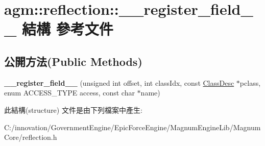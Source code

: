 \hypertarget{structagm_1_1reflection_1_1____register__field____}{}\section{agm\+:\+:reflection\+:\+:\+\_\+\+\_\+register\+\_\+field\+\_\+\+\_\+ 結構 參考文件}
\label{structagm_1_1reflection_1_1____register__field____}
\subsection*{公開方法(Public Methods)}
\begin{DoxyCompactItemize}
\item 
{\bfseries \+\_\+\+\_\+register\+\_\+field\+\_\+\+\_\+} (unsigned int offset, int class\+Idx, const \hyperlink{classagm_1_1reflection_1_1_class_desc}{Class\+Desc} $\ast$pclass, enum A\+C\+C\+E\+S\+S\+\_\+\+T\+Y\+PE access, const char $\ast$name)\hypertarget{structagm_1_1reflection_1_1____register__field_____a4e25bf8483002e0920c7892ab36222fb}{}\label{structagm_1_1reflection_1_1____register__field_____a4e25bf8483002e0920c7892ab36222fb}

\end{DoxyCompactItemize}


此結構(structure) 文件是由下列檔案中產生\+:\begin{DoxyCompactItemize}
\item 
C\+:/innovation/\+Government\+Engine/\+Epic\+Force\+Engine/\+Magnum\+Engine\+Lib/\+Magnum\+Core/reflection.\+h\end{DoxyCompactItemize}

